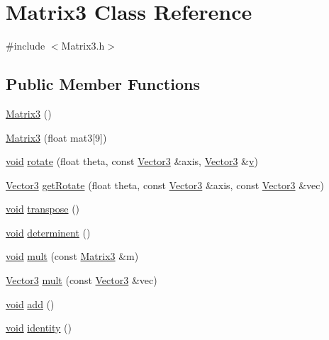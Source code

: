 \hypertarget{class_matrix3}{\section{Matrix3 Class Reference}
\label{class_matrix3}
}


{\ttfamily \#include $<$Matrix3.\-h$>$}

\subsection*{Public Member Functions}
\begin{DoxyCompactItemize}
\item 
\hyperlink{class_matrix3_a773fdcf139826ddb39c30e7d08bbdb90}{Matrix3} ()
\item 
\hyperlink{class_matrix3_a054d0d36d98a27b8ca185ee4b374ebfc}{Matrix3} (float mat3\mbox{[}9\mbox{]})
\item 
\hyperlink{glutf90_8h_ac778d6f63f1aaf8ebda0ce6ac821b56e}{void} \hyperlink{class_matrix3_a1a588e856ea84d9f9dd060da9a9cf12e}{rotate} (float theta, const \hyperlink{class_vector3}{Vector3} \&axis, \hyperlink{class_vector3}{Vector3} \&\hyperlink{gl3_8h_a14cfbe2fc2234f5504618905b69d1e06}{v})
\item 
\hyperlink{class_vector3}{Vector3} \hyperlink{class_matrix3_a2aa9f6c49840a56eec111cd4f732f58f}{get\-Rotate} (float theta, const \hyperlink{class_vector3}{Vector3} \&axis, const \hyperlink{class_vector3}{Vector3} \&vec)
\item 
\hyperlink{glutf90_8h_ac778d6f63f1aaf8ebda0ce6ac821b56e}{void} \hyperlink{class_matrix3_a8bcc33f78083797f0c9d56a0e48c2363}{transpose} ()
\item 
\hyperlink{glutf90_8h_ac778d6f63f1aaf8ebda0ce6ac821b56e}{void} \hyperlink{class_matrix3_afd7e77fa940c21813cf9385ffa5f48dc}{determinent} ()
\item 
\hyperlink{glutf90_8h_ac778d6f63f1aaf8ebda0ce6ac821b56e}{void} \hyperlink{class_matrix3_a88dd27bcab250f39e533836496685401}{mult} (const \hyperlink{class_matrix3}{Matrix3} \&m)
\item 
\hyperlink{class_vector3}{Vector3} \hyperlink{class_matrix3_a1cefb3d3ce92aa27c59f6ef74fd65604}{mult} (const \hyperlink{class_vector3}{Vector3} \&vec)
\item 
\hyperlink{glutf90_8h_ac778d6f63f1aaf8ebda0ce6ac821b56e}{void} \hyperlink{class_matrix3_a13fa30e99a7837e19857e4423adfcb61}{add} ()
\item 
\hyperlink{glutf90_8h_ac778d6f63f1aaf8ebda0ce6ac821b56e}{void} \hyperlink{class_matrix3_a3746fa5497e3cd1e5ab6aa4dd6a2021a}{identity} ()
\end{DoxyCompactItemize}


